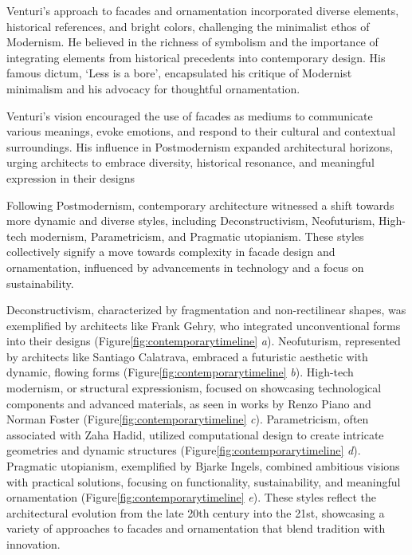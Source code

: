 Venturi's approach to facades and ornamentation incorporated diverse elements, historical references, and bright colors, challenging the minimalist ethos of Modernism.
He believed in the richness of symbolism and the importance of integrating elements from historical precedents into contemporary design\cite{Venturi1971}.
His famous dictum, `Less is a bore', encapsulated his critique of Modernist minimalism and his advocacy for thoughtful ornamentation.

Venturi's vision encouraged the use of facades as mediums to communicate various meanings, evoke emotions, and respond to their cultural and contextual surroundings.
His influence in Postmodernism expanded architectural horizons, urging architects to embrace diversity, historical resonance, and meaningful expression in their designs\cite{Lutolli2020, Stamp2016}


Following Postmodernism, contemporary architecture witnessed a shift towards more dynamic and diverse styles, including Deconstructivism, Neofuturism, High-tech modernism, Parametricism, and Pragmatic utopianism.
These styles collectively signify a move towards complexity in facade design and ornamentation, influenced by advancements in technology and a focus on sustainability.

Deconstructivism, characterized by fragmentation and non-rectilinear shapes, was exemplified by architects like Frank Gehry, who integrated unconventional forms into their designs (Figure\ref{fig:contemporarytimeline} \textit{a}).
Neofuturism, represented by architects like Santiago Calatrava, embraced a futuristic aesthetic with dynamic, flowing forms (Figure\ref{fig:contemporarytimeline} \textit{b}).
High-tech modernism, or structural expressionism, focused on showcasing technological components and advanced materials, as seen in works by Renzo Piano and Norman Foster (Figure\ref{fig:contemporarytimeline} \textit{c}).
Parametricism, often associated with Zaha Hadid, utilized computational design to create intricate geometries and dynamic structures (Figure\ref{fig:contemporarytimeline} \textit{d}).
Pragmatic utopianism, exemplified by Bjarke Ingels, combined ambitious visions with practical solutions, focusing on functionality, sustainability, and meaningful ornamentation (Figure\ref{fig:contemporarytimeline} \textit{e}).
These styles reflect the architectural evolution from the late 20th century into the 21st, showcasing a variety of approaches to facades and ornamentation that blend tradition with innovation.


